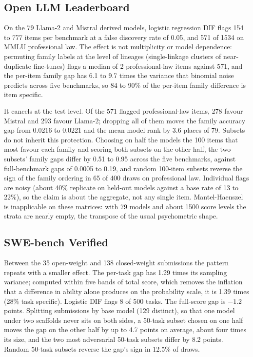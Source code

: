 \documentclass[11pt]{article}
\begin{document}
\subsection{Open LLM Leaderboard}

On the 79 Llama-2 and Mistral derived models, logistic regression DIF flags 154 to 777 items per benchmark at a false discovery rate of 0.05, and 571 of 1534 on MMLU professional law. The effect is not multiplicity or model dependence: permuting family labels at the level of lineages (single-linkage clusters of near-duplicate fine-tunes) flags a median of 2 professional-law items against 571, and the per-item family gap has 6.1 to 9.7 times the variance that binomial noise predicts across five benchmarks, so 84 to 90\% of the per-item family difference is item specific.

It cancels at the test level. Of the 571 flagged professional-law items, 278 favour Mistral and 293 favour Llama-2; dropping all of them moves the family accuracy gap from 0.0216 to 0.0221 and the mean model rank by 3.6 places of 79. Subsets do not inherit this protection. Choosing on half the models the 100 items that most favour each family and scoring both subsets on the other half, the two subsets' family gaps differ by 0.51 to 0.95 across the five benchmarks, against full-benchmark gaps of 0.0005 to 0.19, and random 100-item subsets reverse the sign of the family ordering in 65 of 400 draws on professional law. Individual flags are noisy (about 40\% replicate on held-out models against a base rate of 13 to 22\%), so the claim is about the aggregate, not any single item. Mantel-Haenszel is inapplicable on these matrices: with 79 models and about 1500 score levels the strata are nearly empty, the transpose of the usual psychometric shape.

\subsection{SWE-bench Verified}

Between the 35 open-weight and 138 closed-weight submissions the pattern repeats with a smaller effect. The per-task gap has 1.29 times its sampling variance; computed within five bands of total score, which removes the inflation that a difference in ability alone produces on the probability scale, it is 1.39 times (28\% task specific). Logistic DIF flags 8 of 500 tasks. The full-score gap is $-1.2$ points. Splitting submissions by base model (129 distinct), so that one model under two scaffolds never sits on both sides, a 50-task subset chosen on one half moves the gap on the other half by up to 4.7 points on average, about four times its size, and the two most adversarial 50-task subsets differ by 8.2 points. Random 50-task subsets reverse the gap's sign in 12.5\% of draws.
\end{document}
